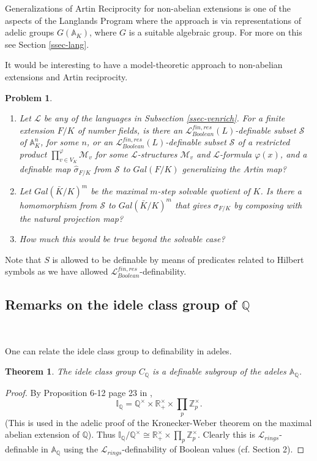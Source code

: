 \documentclass[12pt]{amsart}
\def\A{\mathbb{A}}
\def\I{\mathbb{I}}
\def\R{\mathbb{R}}
\def\S{\mathcal{S}}
\def\Z{\mathbb{Z}}
\def\cL{\mathcal{L}}
\def\R{\mathbb{R}}
\def\Q{\mathbb{Q}}
\def\cL{\mathcal{L}}
\def\cM{\mathcal M}
\newtheorem{thm}{Theorem}[section]
\numberwithin{equation}{section}
\newtheorem{prob}{Problem}[section]
\begin{document}
Generalizations of Artin Reciprocity for non-abelian extensions is one of the aspects of the Langlands Program where the approach is via representations of adelic groups $G(\A_K)$, where $G$ is a suitable algebraic group. For more on this see Section 
\ref{ssec-lang}.

It would be interesting to have a model-theoretic approach to non-abelian extensions and Artin reciprocity. 

\begin{prob}\label{prob-artin}\noindent\begin{enumerate}
\item Let $\cL$ be any of the languages in Subsection \ref{ssec-venrich}. For a finite extension $F/K$ of number fields, is there an $\cL_{Boolean}^{fin,res}(L)$-definable subset $\S$ of $\A_K^n$, for some $n$, or an $\cL_{Boolean}^{fin,res}(L)$-definable subset $\S$ of a restricted product $\prod_{v\in V_K}^{\varphi} \cM_v$ for some $\cL$-structures $\cM_v$ and $\cL$-formula $\varphi(x)$, and a definable map $\hat{\sigma}_{F/K}$ from $\S$ to $Gal(F/K)$ generalizing the Artin map?
\item Let $Gal(\bar{K}/K)^m$ be the maximal $m$-step 
solvable quotient of $K$. Is there a homomorphism from $\S$ to $Gal(\bar{K}/K)^m$ that gives 
$\sigma_{F/K}$ by composing with the natural projection map? 
\item How much this would be true beyond the solvable case?
\end{enumerate}
\end{prob}

Note that $S$ is allowed to be definable by means of predicates related to Hilbert symbols as we have allowed $\cL_{Boolean}^{fin,res}$-definability. 

\medskip

\subsection{\bf Remarks on the idele class group of $\Q$}\label{ssec-idcl}

\

\medskip

One can relate the idele class group to definability in adeles.
\begin{thm} The idele class group $C_{\Q}$ is a definable subgroup of the adeles $\A_{\Q}$.\end{thm}
\begin{proof} By Proposition 6-12 page 23 in \cite{ramak},
$$\I_{\Q}=\Q^{\times} \times \R_{+}^{\times} \times \prod_{p} \Z_p^{\times}.$$
(This is used in the adelic proof of the Kronecker-Weber theorem on the maximal abelian extension of $\Q$).
Thus $\I_{\Q}/\Q^{\times} \cong \R_{+}^{\times} \times \prod_{p} \Z_p^{\times}$. Clearly this is $\cL_{rings}$-definable in $\A_{\Q}$ using the $\cL_{rings}$-definability of Boolean values (cf. Section 2).\end{proof}
\end{document}
